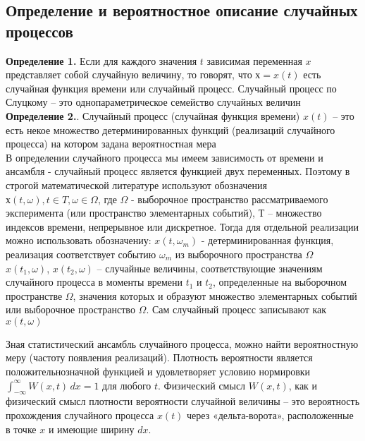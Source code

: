 \newcommand{\colontitulAutors}{astronom\_v\_cube,~edombek}
\newcommand{\colontitulYear}{2023~}
\newcommand{\colontitulEducationalSubject}{Статистическая радиофизика (ТИК) - основные понятия}
\newcommand{\colontitulTeacher}{Мальцев А. А.}




	\small
	\begin{multicols*}{2}
		\section{Определение и вероятностное описание случайных процессов}
		\textbf{Определение 1.} Если для каждого значения $t$ зависимая переменная $x$ представляет собой случайную величину, то говорят, что $х=x(t)$ есть случайная функция времени или случайный процесс. Случайный процесс по Слуцкому – это однопараметрическое семейство случайных величин\\
		\textbf{Определение 2.}. Случайный процесс (случайная функция времени) $x(t)$ – это есть некое множество детерминированных функций (реализаций случайного процесса) на котором задана вероятностная мера\\
		В определении случайного процесса мы имеем зависимость от времени и ансамбля - случайный процесс является функцией двух переменных. Поэтому в строгой математической литературе используют обозначения ${х(t,\omega), t\in T, \omega \in \Omega}$, где $\Omega$ - выборочное пространство рассматриваемого эксперимента (или пространство элементарных событий), $Т$ – множество индексов времени, непрерывное или дискретное. Тогда для отдельной реализации можно использовать обозначениу: $x(t,\omega_m)$ - детерминированная функция, реализация соответствует событию $\omega_m$ из выборочного пространства $\Omega$\\
		$x(t_1,\omega)$, $x(t_2,\omega)$ – случайные величины, соответствующие значениям случайного процесса в моменты времени $t_1$ и $t_2$, определенные на выборочном пространстве $\Omega$, значения которых и образуют множество элементарных событий или выборочное пространство $\Omega$. Сам случайный процесс записывают как $x(t,\omega)$

		Зная статистический ансамбль случайного процесса, можно найти вероятностную меру (частоту появления реализаций). Плотность вероятности является положительнозначной функцией и удовлетворяет условию нормировки $\int_{-\infty}^{\infty} W(x,t) \,dx = 1$ для любого $t$. Физический смысл $W(x,t)$, как и физический смысл плотности вероятности случайной величины – это вероятность прохождения случайного процесса $x(t)$ через «дельта-ворота», расположенные в точке $x$ и имеющие ширину $dx$.\\


\end{multicols*}
